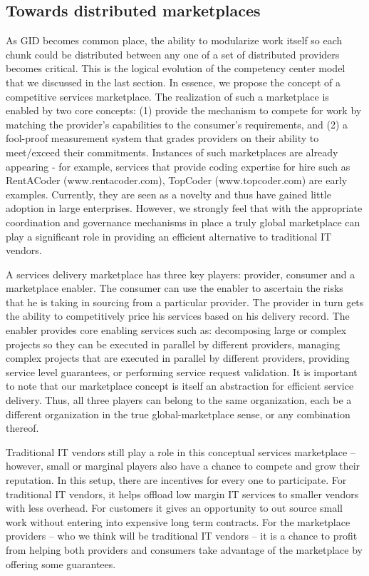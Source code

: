 \subsection{Towards distributed marketplaces}

As GID becomes common place, the ability to modularize work itself so each chunk could be distributed between any one of a set of distributed providers becomes critical. This is the logical evolution of the competency center model that we discussed in the last section. In essence, we propose the concept of a competitive services marketplace.  The realization of such a marketplace is enabled by two core concepts: (1) provide the mechanism to compete for work by matching the provider’s capabilities to the consumer’s requirements, and (2) a fool-proof measurement system that grades providers on their ability to meet/exceed their commitments. Instances of such marketplaces are already appearing - for example, services that provide coding expertise for hire such as RentACoder (www.rentacoder.com), TopCoder (www.topcoder.com) are early examples. Currently, they are seen as a novelty and thus have gained little adoption in large enterprises. However, we strongly feel that with the appropriate coordination and governance mechanisms in place a truly global marketplace can play a significant role in providing an efficient alternative to traditional IT vendors.

 A services delivery marketplace has three key players: provider, consumer and a marketplace enabler. The consumer can use the enabler to ascertain the risks that he is taking in sourcing from a particular provider. The provider in turn gets the ability to competitively price his services based on his delivery record. The enabler provides core enabling services such as: decomposing large or complex projects so they can be executed in parallel by different providers, managing complex projects that are executed in parallel by different providers, providing service level guarantees, or performing service request validation. It is important to note that our marketplace concept is itself an abstraction for efficient service delivery. Thus, all three players can belong to the same organization, each be a different organization in the true global-marketplace sense, or any combination thereof. 
 
 Traditional IT vendors still play a role in this conceptual services marketplace -- however, small or marginal players also have a chance to compete and grow their reputation. In this setup, there are incentives for every one to participate. For traditional IT vendors, it helps offload low margin IT services to smaller vendors with less overhead. For customers it gives an opportunity to out source small work without entering into expensive long term contracts. For the marketplace providers -- who we think will be traditional IT vendors -- it is a chance to profit from helping both providers and consumers take advantage of the marketplace by offering some guarantees.
 
